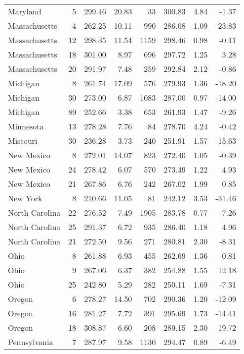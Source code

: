 \begin{longtable}{lrrr@{\extracolsep{10pt}}rrrr}
  Maryland &   5 & 299.46 & 20.83 &  33 & 300.83 & 4.84 & -1.37 \\ 
  Massachusetts &   4 & 262.25 & 10.11 & 990 & 286.08 & 1.09 & -23.83 \\ 
  Massachusetts &  12 & 298.35 & 11.54 & 1159 & 298.46 & 0.98 & -0.11 \\ 
  Massachusetts &  18 & 301.00 & 8.97 & 696 & 297.72 & 1.25 & 3.28 \\ 
  Massachusetts &  20 & 291.97 & 7.48 & 259 & 292.84 & 2.12 & -0.86 \\ 
  Michigan &   8 & 261.74 & 17.09 & 576 & 279.93 & 1.36 & -18.20 \\ 
  Michigan &  30 & 273.00 & 6.87 & 1083 & 287.00 & 0.97 & -14.00 \\ 
  Michigan &  89 & 252.66 & 3.38 & 653 & 261.93 & 1.47 & -9.26 \\ 
  Minnesota &  13 & 278.28 & 7.76 &  84 & 278.70 & 4.24 & -0.42 \\ 
  Missouri &  30 & 236.28 & 3.73 & 240 & 251.91 & 1.57 & -15.63 \\ 
  New Mexico &   8 & 272.01 & 14.07 & 823 & 272.40 & 1.05 & -0.39 \\ 
  New Mexico &  24 & 278.42 & 6.07 & 570 & 273.49 & 1.22 & 4.93 \\ 
  New Mexico &  21 & 267.86 & 6.76 & 242 & 267.02 & 1.99 & 0.85 \\ 
  New York &   8 & 210.66 & 11.05 &  81 & 242.12 & 3.53 & -31.46 \\ 
  North Carolina &  22 & 276.52 & 7.49 & 1905 & 283.78 & 0.77 & -7.26 \\ 
  North Carolina &  25 & 291.37 & 6.72 & 935 & 286.40 & 1.18 & 4.96 \\ 
  North Carolina &  21 & 272.50 & 9.56 & 271 & 280.81 & 2.30 & -8.31 \\ 
  Ohio &   8 & 261.88 & 6.93 & 455 & 262.69 & 1.36 & -0.81 \\ 
  Ohio &   9 & 267.06 & 6.37 & 382 & 254.88 & 1.55 & 12.18 \\ 
  Ohio &  25 & 242.80 & 5.29 & 282 & 250.11 & 1.69 & -7.31 \\ 
  Oregon &   6 & 278.27 & 14.50 & 702 & 290.36 & 1.20 & -12.09 \\ 
  Oregon &  16 & 281.27 & 7.72 & 391 & 295.69 & 1.73 & -14.41 \\ 
  Oregon &  18 & 308.87 & 6.60 & 208 & 289.15 & 2.30 & 19.72 \\ 
  Pennsylvania &   7 & 287.97 & 9.58 & 1130 & 294.47 & 0.89 & -6.49 \\ 

\end{longtable}

